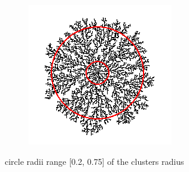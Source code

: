 \documentclass[12pt,a4paper]{scrartcl}
\numberwithin{equation}{subsection}
\newcommand{\1}{\mathbbm{1}}
\numberwithin{equation}{section}
\theoremstyle{definition}
\begin{document}
\begin{figure}[t]
\begin{subfigure}[b]{.31\textwidth}
	\end{subfigure}
	\begin{subfigure}[b]{.31\textwidth}
		\includegraphics[width=1\linewidth]{images/fractal_range/2.PNG}
	\end{subfigure}
	\caption{circle radii range [0.2, 0.75] of the clusters radius}
	\label{filledup}
\end{figure}
\end{document}

